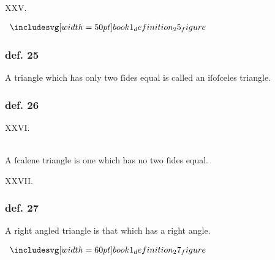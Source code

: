 \hfill

\begin{center}
  XXV.\label{book1def25}\\
\end{center}
\begin{minipage}{0.33\textwidth}
  \begin{center}
    $\img[0][0][50]{book1_definition_25_figure}$
  \end{center}
\end{minipage}%
\begin{minipage}{0.67\textwidth}
  \subsubsection{def. 25}
  \begin{center}
    \raggedright A triangle which has only two ſides equal is called an iſoſceles triangle.
  \end{center}
\end{minipage}

\hfill

\begin{minipage}{0.1\textwidth}
  \phantom{}
\end{minipage}%
\begin{minipage}{0.8\textwidth}
  \subsubsection{def. 26}
  \begin{center}
    XXVI.\label{book1def26}\\
    \hfill\\
    \raggedright A ſcalene triangle is one which has no two ſides equal.\\
  \end{center}
\end{minipage}%
\begin{minipage}{0.1\textwidth}
  \phantom{}
\end{minipage}%

\pagebreak

\begin{center}
  XXVII.\label{book1def27}\\
\end{center}
\begin{minipage}{0.67\textwidth}
  \subsubsection{def. 27}
  \begin{center}
    A right angled triangle is that which has a right angle.
  \end{center}
\end{minipage}%
\begin{minipage}{0.33\textwidth}
  \begin{center}
    $\img[0][0][60]{book1_definition_27_figure}$
  \end{center}
\end{minipage}

